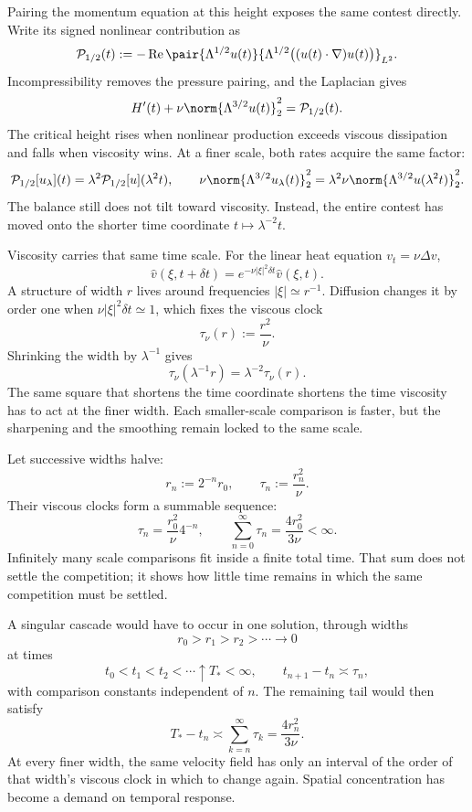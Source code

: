 
Pairing the momentum equation at this height exposes the same contest directly.
Write its signed nonlinear contribution as
\[
  \mathcal P_{1/2}(t)
  :=
  -\operatorname{Re}
  \pair
    {\Lambda^{1/2}u(t)}
    {\Lambda^{1/2}\bigl((u(t)\cdot\nabla)u(t)\bigr)}_{L^2}.
\]
Incompressibility removes the pressure pairing, and the Laplacian gives
\[
  H'(t)
  +
  \nu\norm{\Lambda^{3/2}u(t)}_2^2
  =
  \mathcal P_{1/2}(t).
\]
The critical height rises when nonlinear production exceeds viscous dissipation and falls when viscosity wins.
At a finer scale, both rates acquire the same factor:
\[
  \mathcal P_{1/2}[u_\lambda](t)
  =
  \lambda^2\mathcal P_{1/2}[u](\lambda^2t),
  \qquad
  \nu\norm{\Lambda^{3/2}u_\lambda(t)}_2^2
  =
  \lambda^2\nu\norm{\Lambda^{3/2}u(\lambda^2t)}_2^2.
\]
The balance still does not tilt toward viscosity.
Instead, the entire contest has moved onto the shorter time coordinate \(t\mapsto\lambda^{-2}t\).


Viscosity carries that same time scale.
For the linear heat equation \(v_t=\nu\Delta v\),
\[
  \widehat v(\xi,t+\delta t)
  =
  e^{-\nu|\xi|^2\delta t}\widehat v(\xi,t).
\]
A structure of width \(r\) lives around frequencies \(|\xi|\simeq r^{-1}\).
Diffusion changes it by order one when \(\nu|\xi|^2\delta t\simeq1\), which fixes the viscous clock
\[
  \tau_\nu(r)
  :=
  \frac{r^2}{\nu}.
\]
Shrinking the width by \(\lambda^{-1}\) gives
\[
  \tau_\nu(\lambda^{-1}r)
  =
  \lambda^{-2}\tau_\nu(r).
\]
The same square that shortens the \NavierStokes{} time coordinate shortens the time viscosity has to act at the finer width.
Each smaller-scale comparison is faster, but the sharpening and the smoothing remain locked to the same scale.


Let successive widths halve:
\[
  r_n:=2^{-n}r_0,
  \qquad
  \tau_n:=\frac{r_n^2}{\nu}.
\]
Their viscous clocks form a summable sequence:
\[
  \tau_n
  =
  \frac{r_0^2}{\nu}4^{-n},
  \qquad
  \sum_{n=0}^{\infty}\tau_n
  =
  \frac{4r_0^2}{3\nu}
  <
  \infty.
\]
Infinitely many scale comparisons fit inside a finite total time.
That sum does not settle the competition; it shows how little time remains in which the same competition must be settled.

A singular cascade would have to occur in one solution, through widths
\[
  r_0>r_1>r_2>\cdots\longrightarrow0
\]
at times
\[
  t_0<t_1<t_2<\cdots\uparrow T_*<\infty,
  \qquad
  t_{n+1}-t_n\asymp\tau_n,
\]
with comparison constants independent of \(n\).
The remaining tail would then satisfy
\[
  T_*-t_n
  \asymp
  \sum_{k=n}^{\infty}\tau_k
  =
  \frac{4r_n^2}{3\nu}.
\]
At every finer width, the same velocity field has only an interval of the order of that width's viscous clock in which to change again.
Spatial concentration has become a demand on temporal response.

